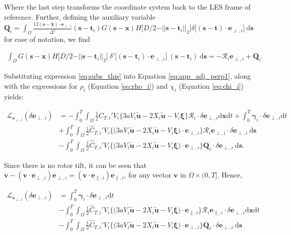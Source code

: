 \documentclass[energies,article,submit,moreauthors,latex,10pt,a4paper]{mdpi}
\newcommand{\ds}{~\text{d}\boldsymbol{s}}
\newcommand{\bs}[1]{\boldsymbol{#1}}
\newcommand{\dx}{\text{d}\boldsymbol{x}}
\newcommand{\dt}{\text{d}t}
\newcommand{\stint}{\int_{0}^{T} \int_{\Omega}}
\newcommand{\sint}{\int_{\Omega}}
\newcommand{\Tint}{\int_{0}^{T}}
\newcommand{\utilde}{\widetilde{\bs{u}}}
\newcommand{\ctihat}{\widehat{C}_{T,i}'}
\newcommand{\R}{\mathscr{R}}
\newcommand{\Lagr}{\mathscr{L}}
\newcommand{\eperpi}{\bs{e}_{\perp,i}}
\newcommand{\etransi}{\bs{e}_{\parallel,i}}
\newcommand{\diracdelta}{{\delta}}
\begin{document}
\noindent Where the last step transforms the coordinate system back to the LES frame of reference. Further, defining the auxiliary variable $\bs{Q}_i = \sint \frac{12 (\bs{s} - \bs{x})\cdot \eperpi}{\Delta^2} (\bs{s} - \bs{t}_i) G(\bs{s} - \bs{x})  H\big[D/2 - \vert\vert \bs{s} - \bs{t}_i \vert\vert_2 \big] \diracdelta\big[(\bs{s} - \bs{t})\cdot \eperpi \big] \ds$ for ease of notation, we find

\begin{align}
\sint G(\bs{s} - \bs{x})  H\big[D/2 - \vert\vert \bs{s} - \bs{t}_i \vert\vert_2 \big]~\diracdelta'\big[(\bs{s} - \bs{t}_i) \cdot \eperpi \big]~(\bs{s} - \bs{t}_i)  \ds 
=  - \R_i \eperpi + \bs{Q}_i. \label{eq:subs_this}
\end{align}

\noindent Substituting expression \eqref{eq:subs_this} into Equation \eqref{eq:app_adj_perp1}, along with the expressions for $\rho_i$ (Equation \ref{eq:rho_i}) and $\chi_i$ (Equation \ref{eq:chi_i}) yields:

\begin{align}
\Lagr_{\eperpi}(\delta \eperpi) &= - \stint \frac{1}{2} \ctihat V_i \bigg\{ 3a V_i \utilde  - 2 X_i \utilde - V_i\bs{\xi}   \bigg\} \R_i \cdot \delta \eperpi \dx \dt + \Tint \bs{\gamma}_i \cdot \delta \eperpi \dt \nonumber\\
& + \stint \frac{1}{2} \ctihat V_i \bigg\{ \bigg(3aV_i \utilde  -2 X_i \utilde - V_i\bs{\xi} \bigg) \cdot \eperpi \bigg\} \R_i \eperpi \cdot \delta \eperpi \ds \nonumber \\
& - \stint \frac{1}{2} \ctihat V_i \bigg\{ \bigg(3aV_i \utilde  -2 X_i \utilde - V_i\bs{\xi} \bigg) \cdot \eperpi \bigg\} \bs{Q}_i \cdot \delta \eperpi \ds. 
\end{align}

\noindent Since there is no rotor tilt, it can be seen that $\bs{v} - ( \bs{v} \cdot \eperpi ) \eperpi = (\bs{v} \cdot \etransi) \etransi$, for any vector $\bs{v}$ in $\Omega \times (0, T]$. Hence, 

\begin{align}
\Lagr_{\eperpi}(\delta \eperpi) &= \Tint \bs{\gamma}_i \cdot \delta \eperpi \dt \nonumber\\
& - \stint \frac{1}{2} \ctihat V_i \bigg\{ \bigg(3a V_i \utilde  - 2 X_i \utilde - V_i\bs{\xi} \bigg) \cdot \etransi   \bigg\} \R_i \etransi \cdot \delta \eperpi \dx \dt \nonumber \\
& - \stint \frac{1}{2} \ctihat V_i \bigg\{ \bigg(3aV_i \utilde  -2 X_i \utilde - V_i\bs{\xi} \bigg) \cdot \eperpi \bigg\} \bs{Q}_i \cdot \delta \eperpi \ds 
\end{align}
\end{document}
